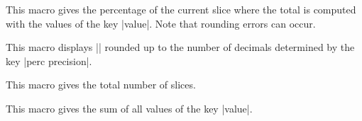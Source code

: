 \documentclass[a4paper,english,dvipsnames]{ltxdoc}
\begin{document}
\begin{command}{\WCpercentage}
This macro gives the percentage of the current slice where the total is computed with the values of the key |value|. Note that rounding errors can occur.
\begin{codeexample}[]
\begin{tikzpicture}
\wheelchart[
    data={\WCvarC\\\WCperc},
    slices style={
        /utils/exec=\pgfmathsetmacro{\WCcolornumber}{4*\WCpercentage},
        \WCvarB!\WCcolornumber
    }
]{\exampleforthismanual}
\end{tikzpicture}
\end{codeexample}
\end{command}
\begin{command}{\WCpercentagerounded}
This macro displays |\WCpercentage| rounded up to the number of decimals determined by the key |perc precision|.
\end{command}
\begin{command}{\WCtotalcount}
This macro gives the total number of slices.
\end{command}
\begin{command}{\WCtotalnum}
This macro gives the sum of all values of the key |value|.
\begin{codeexample}[width=10cm]
\begin{tikzpicture}
\wheelchart[
    data={\WCvarC: \WCvarA},
    middle={%
        \textbf{\huge Fruit}\\%
        \WCtotalcount{} species\\%
        \pgfmathprintnumber{\WCtotalnum}
        pieces%
    }
]{\exampleforthismanual}
\end{tikzpicture}
\end{codeexample}
\end{command}
\begin{command}{\WCvarA}
\end{command}
\begin{command}{\WCvarB}
\end{command}
\begin{command}{\WCvarC}
\end{command}
\begin{command}{\WCvarD}
\end{command}
\begin{command}{\WCvarE}
\end{command}
\begin{command}{\WCvarF}
\end{command}
\end{document}
